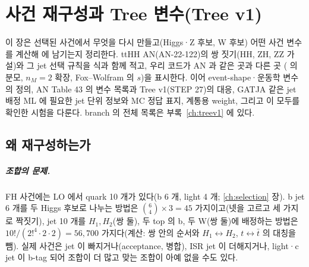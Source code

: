 \chapter{사건 재구성과 Tree 변수(Tree v1)}\label{ch:reco}

이 장은 선택된 사건에서 무엇을 다시 만들고(Higgs·Z 후보, W 후보) 어떤 사건 변수를 계산해  에 남기는지 정리한다.
ttHH AN(AN-22-122)의 \chisq{} 쌍 짓기(HH, ZH, ZZ 가설)와 그 jet 선택 규칙을 식과 함께 적고, 우리 코드가 AN 과 같은 곳과 다른 곳
(\chisq{} 의 분모, $n_M=2$ 확장, Fox–Wolfram 의 $s$)을 표시한다. 이어 event-shape·운동학 변수의 정의, AN Table 43 의 변수 목록과
Tree v1(STEP 27)의 대응, GATJA 같은 jet 배정 ML 에 필요한 jet 단위 정보와 MC 정답 표지, 계통용 weight, 그리고 이 모두를 확인한
시험을 다룬다. branch 의 전체 목록은 부록~\ref{ch:treev1} 에 있다.

\section{왜 재구성하는가}\label{sec:reco-why}

\paragraph{조합의 문제.}
FH \ttHH{} 사건에는 LO 에서 quark 10 개가 있다(b 6 개, light 4 개; \ref{ch:selection} 장). b jet 6 개를 두 Higgs 후보로 나누는 방법은
$\binom{6}{4}\times3=45$ 가지이고(넷을 고르고 세 가지로 짝짓기), jet 10 개를 $H_1, H_2$(쌍 둘), 두 top 의 b, 두 W(쌍 둘)에 배정하는 방법은
$10!/(2!^4\cdot2\cdot2)=56{,}700$ 가지다(계산: 쌍 안의 순서와 $H_1\leftrightarrow H_2$, $t\leftrightarrow\bar t$ 의 대칭을 뺌). 실제 사건은
jet 이 빠지거나(acceptance, 병합), ISR jet 이 더해지거나, light·c jet 이 b-tag 되어 조합이 더 많고 맞는 조합이 아예 없을 수도 있다.

